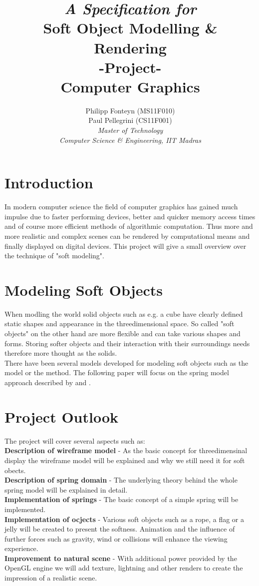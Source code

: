 \documentclass[11pt]{article}
\title{
	\emph{A Specification for}\\
	\huge{\textbf{Soft Object Modelling \& Rendering} }\\
	-Project-\\
	Computer Graphics\\[2em]	
}
\author{
	Philipp Fonteyn (MS11F010)\\
	Paul Pellegrini (CS11F001)\\[2em]
	\emph{Master of Technology}\\
	\emph{Computer Science \& Engineering, IIT Madras}
}
\begin{document}
\maketitle
\newpage

%
%
%
\section{Introduction}
In modern computer science the field of computer graphics has gained much impulse due to faster performing devices, better and quicker memory access times and of course more efficient methods of algorithmic computation. Thus more and more realistic and complex scenes can be rendered by computational means and finally displayed on digital devices. This project will give a small overview over the technique of "soft modeling".
%
%
%
\section{Modeling Soft Objects}
When modling the world solid objects such as e.g. a cube have clearly defined static shapes and appearance in the threedimensional space. So called "soft objects" on the other hand are more flexible and can take various shapes and forms. Storing softer objects and their interaction with their surroundings needs therefore more thought as the solids.\\[1em]
%
There have been several models developed for modeling soft objects such as the \cite{} model or the \cite{} method. The following paper will focus on the spring model approach described by \cite{} and \cite{}.

%
%
%
\section{Project Outlook}
The project will cover several aspects such as:\\[1em]
%
\textbf{Description of wireframe model} - As the basic concept for threedimensinal display the wireframe model will be explained and why we still need it for soft obects.\\[1em]
%
\textbf{Description of spring domain} - The underlying theory behind the whole spring model will be explained in detail.\\[1em]
%
\textbf{Implementation of springs} - The basic concept of a simple spring will be implemented.\\[1em]
%
\textbf{Implementation of ocjects} - Various soft objects such as a rope, a flag or a jelly will be created to present the softness. Animation and the influence of further forces such as gravity, wind or collisions will enhance the viewing experience.\\[1em]
%
\textbf{Improvement to natural scene} - With additional power provided by the OpenGL engine we will add texture, lightning and other renders to create the impression of a realistic scene.
%
\end{document}
